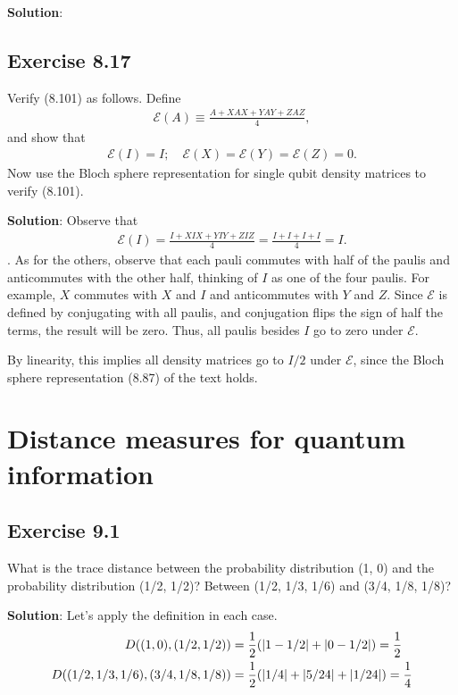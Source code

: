 \documentclass{book}
\begin{document}
    \textbf{Solution}:

\section*{Exercise 8.17}
    Verify (8.101) as follows. Define
    \begin{align}
        \mathcal{E}(A) \equiv \frac{A + XAX + YAY + ZAZ}{4},
    \end{align}
    and show that
    \begin{align}
        \mathcal{E}(I) = I; \quad \mathcal{E}(X) = \mathcal{E}(Y) = \mathcal{E}(Z) = 0.
    \end{align}
    Now use the Bloch sphere representation for single qubit density matrices to verify (8.101).

    \textbf{Solution}: Observe that
    \begin{align}
        \mathcal{E}(I) = \frac{I + X IX + YIY + ZIZ}{4} = \frac{I + I + I + I}{4} = I.
    \end{align}.
    As for the others, observe that each pauli commutes with half of the paulis and anticommutes with the other half, thinking of $I$ as one of the four paulis. For example, $X$ commutes with $X$ and $I$ and anticommutes with $Y$ and $Z$. Since $\mathcal{E}$ is defined by conjugating with all paulis, and conjugation flips the sign of half the terms, the result will be zero. Thus, all paulis besides $I$ go to zero under $\mathcal{E}$.

    By linearity, this implies all density matrices go to $I/2$ under $\mathcal{E}$, since the Bloch sphere representation (8.87) of the text holds.

\chapter{Distance measures for quantum information}

\section*{Exercise 9.1}
    What is the trace distance between the probability distribution (1, 0) and the probability distribution (1/2, 1/2)? Between (1/2, 1/3, 1/6) and (3/4, 1/8, 1/8)?
    
    \textbf{Solution}: Let's apply the definition in each case.
    \begin{align}
    \begin{aligned}
        D((1,0), (1/2,1/2)) &= \frac{1}{2} (\abs{1-1/2}+\abs{0-1/2}) = \frac{1}{2}\\
        D((1/2,1/3,1/6), (3/4,1/8,1/8)) &= \frac{1}{2} (\abs{1/4} + \abs{5/24}+\abs{1/24}) = \frac{1}{4}
    \end{aligned}
    \end{align}
    
\end{document}
